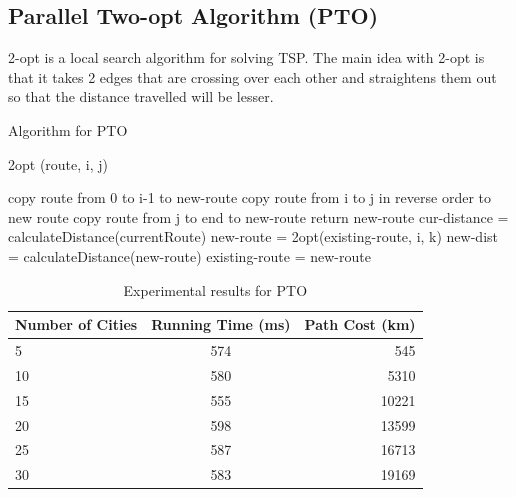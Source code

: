 \documentclass[conference]{IEEEtran}
\begin{document}
\subsection {Parallel Two-opt Algorithm (PTO)}
2-opt is a local search algorithm for solving TSP. The main idea with 2-opt is that it takes 2 edges that are crossing over each other and straightens them out so that the distance travelled will be lesser.



\newlength\myindent
\setlength\myindent{2em}
\newcommand\bindent{%
  \begingroup
  \setlength{\itemindent}{\myindent}
  \addtolength{\algorithmicindent}{\myindent}
}
\newcommand\eindent{\endgroup}
\begin{algorithm}[H]
\caption{Algorithm for PTO}
\begin{algorithmic}[1]
\STATE 2opt (route, i, j)
\bindent
\STATE copy route from 0 to i-1 to new-route
\STATE copy route from i to j in reverse order to new route
\STATE copy route from j to end to new-route
\STATE return new-route
\eindent
\REPEAT
\STATE cur-distance = calculateDistance(currentRoute)
\STATE new-route = 2opt(existing-route, i, k)
\STATE new-dist = calculateDistance(new-route)
\STATE existing-route = new-route
\ENDIF
\ENDFOR
\ENDFOR 
{}
\end{algorithmic}
\end{algorithm} 




\begin{table}[h!]
  \begin{center}
    \label{tab:table3}
    \begin{tabular}{l|c|r}
      \textbf{Number of Cities} & \textbf{Running Time (ms)} & \textbf{Path Cost (km)}\\
      \hline
      5 & 574 & 545\\
      10 & 580 & 5310\\
      15 & 555 & 10221\\
      20 & 598 & 13599\\ 
      25 & 587 & 16713\\
      30 & 583 & 19169\\
    \end{tabular}
    \caption{Experimental results for PTO}
  \end{center}
\end{table}
\end{document}

